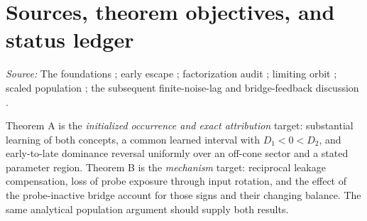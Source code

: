 \documentclass[11pt]{article}
\numberwithin{equation}{section}
\theoremstyle{definition}
\theoremstyle{remark}
\newcommand{\1}{\mathbf 1}
\newcommand{\source}[1]{\par\noindent\textit{Source:} #1\par\smallskip}
\begin{document}
\tableofcontents
\clearpage

\section{Sources, theorem objectives, and status ledger}\label{pa:status}
\source{The foundations \cite{F}; early escape \cite{E}; factorization audit
\cite{LC}; limiting orbit \cite{TN}; scaled population \cite{SP}; the subsequent
finite-noise-lag and bridge-feedback discussion \cite{C}.}

Theorem A is the \emph{initialized occurrence and exact attribution} target:
substantial learning of both concepts, a common learned interval with
$D_1<0<D_2$, and early-to-late dominance reversal uniformly over an off-cone
sector and a stated parameter region. Theorem B is the \emph{mechanism}
target: reciprocal leakage compensation, loss of probe exposure through
input rotation, and the effect of the probe-inactive bridge account for
those signs and their changing balance. The same analytical population
argument should supply both results.
\end{document}
